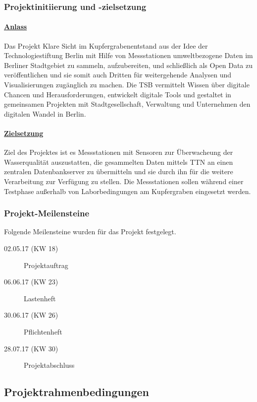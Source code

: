 \subsubsection{Projektinitiierung und -zielsetzung}

\paragraph{\uline{Anlass}}

Das Projekt \glqq Klare Sicht im Kupfergraben\grqq entstand aus der Idee der Technologiestiftung Berlin mit Hilfe von Messstationen umweltbezogene Daten im Berliner Stadtgebiet zu sammeln, aufzubereiten, und schließlich als \glqq Open Data\grqq{} zu veröffentlichen und sie somit auch Dritten für weitergehende Analysen und Visualisierungen zugänglich zu machen.
Die TSB vermittelt Wissen über digitale Chancen und Herausforderungen, entwickelt digitale Tools und gestaltet in gemeinsamen Projekten mit Stadtgesellschaft, Verwaltung und Unternehmen den digitalen Wandel in Berlin.

\paragraph{\uline{Zielsetzung}}

Ziel des Projektes ist es Messstationen mit Sensoren zur Überwacheung der Wasserqualität auszustatten, die gesammelten Daten mittels TTN an einen zentralen Datenbankserver zu übermitteln und sie durch ihn für die weitere Verarbeitung zur Verfügung zu stellen. Die Messstationen sollen während einer Testphase außerhalb von Laborbedingungen am Kupfergraben eingesetzt werden.

\subsubsection{Projekt-Meilensteine}

Folgende Meilensteine wurden f\"ur das Projekt festgelegt.

\begin{description}
	\item[02.05.17 (KW 18)] Projektauftrag
	\item[06.06.17 (KW 23)] Lastenheft
	\item[30.06.17 (KW 26)] Pflichtenheft
	\item[28.07.17 (KW 30)] Projektabschluss
\end{description}

\subsection{Projektrahmenbedingungen}

